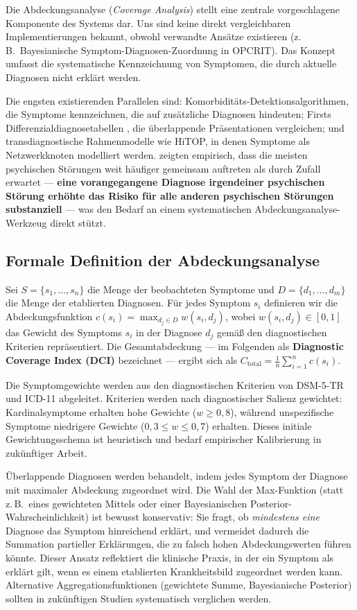\documentclass[11pt,a4paper]{article}
\begin{document}
Die Abdeckungsanalyse (\textit{Coverage Analysis}) stellt eine zentrale vorgeschlagene Komponente des Systems dar. Uns sind keine direkt vergleichbaren Implementierungen bekannt, obwohl verwandte Ans\"atze existieren (z.\,B.\ Bayesianische Symptom-Diagnosen-Zuordnung in OPCRIT). Das Konzept umfasst die systematische Kennzeichnung von Symptomen, die durch aktuelle Diagnosen nicht erkl\"art werden.

Die engsten existierenden Parallelen sind: Komorbidit\"ats-Detektionsalgorithmen, die Symptome kennzeichnen, die auf zus\"atzliche Diagnosen hindeuten; Firsts Differenzialdiagnosetabellen \citep{First2024}, die \"uberlappende Pr\"asentationen vergleichen; und transdiagnostische Rahmenmodelle wie HiTOP, in denen Symptome als Netzwerkknoten modelliert werden. \citet{PlanaRipoll2019} zeigten empirisch, dass die meisten psychischen St\"orungen weit h\"aufiger gemeinsam auftreten als durch Zufall erwartet --- \textbf{eine vorangegangene Diagnose irgendeiner psychischen St\"orung erh\"ohte das Risiko f\"ur alle anderen psychischen St\"orungen substanziell} --- was den Bedarf an einem systematischen Abdeckungsanalyse-Werkzeug direkt st\"utzt.

\subsection{Formale Definition der Abdeckungsanalyse}

Sei $S = \{s_1, \ldots, s_n\}$ die Menge der beobachteten Symptome und $D = \{d_1, \ldots, d_m\}$ die Menge der etablierten Diagnosen. F\"ur jedes Symptom $s_i$ definieren wir die Abdeckungsfunktion $c(s_i) = \max_{d_j \in D} w(s_i, d_j)$, wobei $w(s_i, d_j) \in [0, 1]$ das Gewicht des Symptoms $s_i$ in der Diagnose $d_j$ gem\"a\ss{} den diagnostischen Kriterien repr\"asentiert. Die Gesamtabdeckung --- im Folgenden als \textbf{Diagnostic Coverage Index (DCI)} bezeichnet --- ergibt sich als $C_{\text{total}} = \frac{1}{n} \sum_{i=1}^{n} c(s_i)$.

Die Symptomgewichte werden aus den diagnostischen Kriterien von DSM-5-TR und ICD-11 abgeleitet. Kriterien werden nach diagnostischer Salienz gewichtet: Kardinalsymptome erhalten hohe Gewichte ($w \geq 0{,}8$), w\"ahrend unspezifische Symptome niedrigere Gewichte ($0{,}3 \leq w \leq 0{,}7$) erhalten. Dieses initiale Gewichtungsschema ist heuristisch und bedarf empirischer Kalibrierung in zuk\"unftiger Arbeit.

\"Uberlappende Diagnosen werden behandelt, indem jedes Symptom der Diagnose mit maximaler Abdeckung zugeordnet wird. Die Wahl der Max-Funktion (statt z.\,B.\ eines gewichteten Mittels oder einer Bayesianischen Posterior-Wahrscheinlichkeit) ist bewusst konservativ: Sie fragt, ob \textit{mindestens eine} Diagnose das Symptom hinreichend erkl\"art, und vermeidet dadurch die Summation partieller Erkl\"arungen, die zu falsch hohen Abdeckungswerten f\"uhren k\"onnte. Dieser Ansatz reflektiert die klinische Praxis, in der ein Symptom als \glqq erkl\"art\grqq{} gilt, wenn es einem etablierten Krankheitsbild zugeordnet werden kann. Alternative Aggregationsfunktionen (gewichtete Summe, Bayesianische Posterior) sollten in zuk\"unftigen Studien systematisch verglichen werden.
\end{document}
